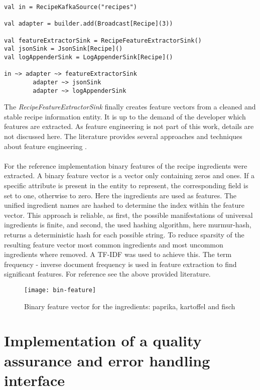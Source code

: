 \begin{lstlisting}[style=myScalastyle,label={lst:output},caption={Example of Akka streams graph DSL for splitting streams}]
val in = RecipeKafkaSource("recipes")

val adapter = builder.add(Broadcast[Recipe](3))

val featureExtractorSink = RecipeFeatureExtractorSink()
val jsonSink = JsonSink[Recipe]()
val logAppenderSink = LogAppenderSink[Recipe]()

in ~> adapter ~> featureExtractorSink
        adapter ~> jsonSink
        adapter ~> logAppenderSink
\end{lstlisting}

The \textit{RecipeFeatureExtractorSink} finally creates feature vectors from a cleaned and stable recipe information entity. It is up to the demand of the developer which features are extracted. As feature engineering is not part of this work, details are not discussed here. The literature provides several approaches and techniques about feature engineering \cite{mastering_feature_engineering_2017} \cite{liu_2001}. 
\\\\
For the reference implementation binary features of the recipe ingredients were extracted. A binary feature vector is a vector only containing zeros and ones. If a specific attribute is present in the entity to represent, the corresponding field is set to one, otherwise to zero. Here the ingredients are used as features. The unified ingredient names are hashed to determine the index within the feature vector. This approach is reliable, as first, the possible manifestations of universal ingredients is finite, and second, the used hashing algorithm, here murmur-hash, returns a deterministic hash for each possible string. To reduce sparsity of the resulting feature vector most common ingredients and most uncommon ingredients where removed. A TF-IDF was used to achieve this. The term frequency - inverse document frequency is used in feature extraction to find significant features. For reference see the above provided literature.

\begin{figure}[htb]
  \centering
  \texttt{[image: bin-feature]}\\
  \caption{Binary feature vector for the ingredients: paprika, kartoffel and fisch}
  \label{fig:bin-feature}
\end{figure}

\section{Implementation of a quality assurance and error handling interface}

